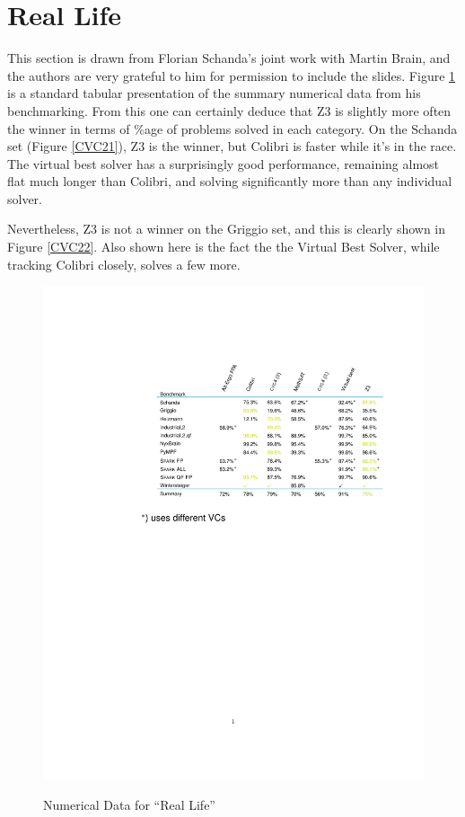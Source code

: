 \documentclass{easychair}
\begin{document}
\section{Real Life}\label{sec:RL}
This section is drawn from Florian Schanda's joint work with Martin Brain, and the authors are very grateful to him for permission to include the slides.  Figure \ref{CVC16} is a standard tabular presentation of the summary numerical data from his benchmarking. From this one can certainly deduce that Z3 is slightly more  often the winner in terms of \%age of problems solved in each category. 
On the Schanda set (Figure \ref{CVC21}), Z3 is the winner, but Colibri is faster while it's in the race. The virtual best solver has a surprisingly good performance, remaining almost flat much longer than Colibri, and solving significantly more than any individual solver.
\par
 Nevertheless, Z3 is not a winner on the Griggio set, and this is clearly shown in Figure \ref{CVC22}. Also shown here is the fact the the Virtual Best Solver, while tracking Colibri closely, solves a few more. 
\begin{figure}[h]
\caption{Numerical Data for ``Real Life''\label{CVC16}}
\vskip-160pt
{\hskip-180pt\includegraphics{ExtractCVC16trimv2.pdf}}\vskip-200pt
\end{figure}\iffalse
\end{document}
